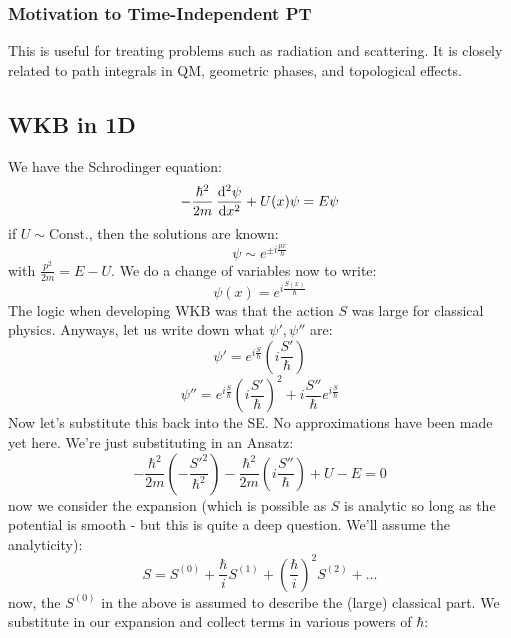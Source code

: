 \subsubsection{Motivation to Time-Independent PT}
This is useful for treating problems such as radiation and scattering. It is closely related to path integrals in QM, geometric phases, and topological effects. 

\subsection{WKB in 1D}
We have the Schrodinger equation:
\begin{equation}
    -\frac{\hbar^2}{2m}\dod[2]{\psi}{x} + U(x)\psi = E\psi
\end{equation}
if $U \sim \text{Const.}$, then the solutions are known:
\begin{equation}
    \psi \sim e^{\pm i\frac{px}{\hbar}}
\end{equation}
with $\frac{p^2}{2m} = E - U$. We do a change of variables now to write:
\begin{equation}
    \psi(x) = e^{i\frac{S(x)}{\hbar}}
\end{equation}
The logic when developing WKB was that the action $S$ was large for classical physics. Anyways, let us write down what $\psi', \psi''$ are:
\begin{equation}
    \psi' = e^{i\frac{S}{\hbar}}\left(i\frac{S'}{\hbar}\right)
\end{equation}
\begin{equation}
    \psi'' = e^{i\frac{S}{\hbar}}\left(i\frac{S'}{\hbar}\right)^2 + i\frac{S''}{\hbar}e^{i\frac{S}{\hbar}}
\end{equation}
Now let's substitute this back into the SE. No approximations have been made yet here. We're just substituting in an Ansatz:
\begin{equation}
    -\frac{\hbar^2}{2m}\left(-\frac{S'^2}{\hbar^2}\right) - \frac{\hbar^2}{2m}\left(i\frac{S''}{\hbar}\right) + U - E = 0
\end{equation}
now we consider the expansion (which is possible as $S$ is analytic so long as the potential is smooth - but this is quite a deep question. We'll assume the analyticity):
\begin{equation}
    S = S^{(0)} + \frac{\hbar}{i}S^{(1)} + \left(\frac{\hbar}{i}\right)^2S^{(2)} + \ldots
\end{equation}
now, the $S^{(0)}$ in the above is assumed to describe the (large) classical part. We substitute in our expansion and collect terms in various powers of $\hbar$:
